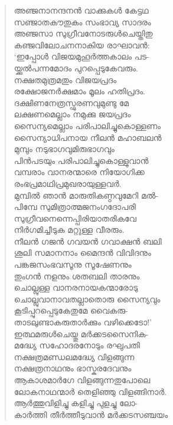 \begin{verse}
അഞ്ജനാനന്ദനന്‍ വാക്കുകള്‍ കേട്ടഥ\\
സഞ്ജാതകൗതുകം സംഭാവ്യ സാദരം\\
അഞ്ജസാ സുഗ്രീവനോടരുള്‍ചെയ്തിതു\\
കഞ്ജവിലോചനനാകിയ രാഘാവന്‍:\\
‘ഇപ്പോള്‍ വിജയമുഹൂര്‍ത്തകാലം പട-\\
യ്ക്കുല്‍പന്നമോദം പുറപ്പെടുകേവരും.\\
നക്ഷതമുത്രമതും വിജയപ്രദം\\
രക്ഷോജനര്‍ക്ഷമാം മൂലം ഹതിപ്രദം.\\
ദക്ഷിണനേത്രസ്ഫുരണവുമുണ്ടു മേ\\
ലക്ഷണമെല്ലാം നമുക്കു ജയപ്രദം\\
സൈന്യമെല്ലാം പരിപാലിച്ചുകൊള്ളണം\\
സൈന്യാധിപനായ നീലന്‍ മഹാബലന്‍\\
മുമ്പും നടുഭാഗവുമിരുഭാഗവും\\
പിന്‍പടയും പരിപാലിച്ചുകൊള്ളുവാന്‍\\
വമ്പരാം വാനരന്മാരെ നിയോഗിക്ക\\
രംഭപ്രമാഥിപ്രമുഖരായുള്ളവര്‍.\\
മുമ്പില്‍ ഞാന്‍ മാരുതികണ്ഠവുമേറി മല്‍-\\
പിമ്പേ സുമിത്രാത്മജനംഗദോപരി\\
സുഗ്രീവനെന്നെപ്പിരിയാതരികവേ\\
നിര്‍ഗമിച്ചീടുക മറ്റുള്ള വീരരും.\\
നീലന്‍ ഗജന്‍ ഗവയന്‍ ഗവാക്ഷന്‍ ബലി\\
ശൂലി സമാനനാം മൈന്ദന്‍ വിവിദനും\\
പങ്കജസംഭവസൂനു സൂഷേണനും\\
തുംഗന്‍ നളനും ശതബലി താരനും\\
ചൊല്ലുള്ള വാനരനായകന്മാരോടു\\
ചൊല്ലുവാനാവതല്ലാതൊരു സൈന്യവും\\
കൂടിപ്പുറപ്പെടുകേതുമേ വൈകരു-\\
താടലുണ്ടാകരുതാര്‍ക്കും വഴിക്കെടോ!’\\
ഇത്ഥമരുള്‍ചെയ്തു മര്‍ക്കടസൈനിക-\\
മദ്ധ്യേ സഹോദരനോടും രഘുപതി\\
നക്ഷത്രമണ്ഡലമദ്ധ്യേ വിളങ്ങുന്ന\\
നക്ഷത്രനാഥനും ഭാസ്കരദേവനും\\
ആകാശമാര്‍ഗേ വിളങ്ങുന്നതുപോലെ\\
ലോകനാഥന്മാര്‍ തെളിഞ്ഞു വിളങ്ങിനാര്‍.\\
ആര്‍ത്തുവിളിച്ചു കളിച്ചു പുളച്ചു ലോ-\\
കാര്‍ത്തി തീര്‍ത്തീടുവാന്‍ മര്‍ക്കടസഞ്ചയം\\

\end{verse}
